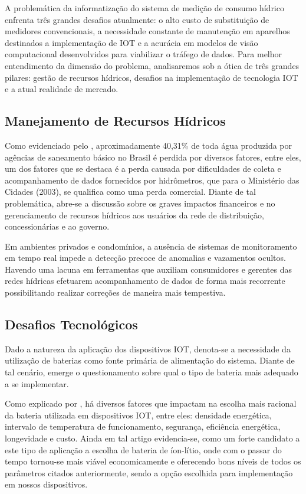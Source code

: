 
A problemática da informatização do sistema de medição de consumo hídrico enfrenta três grandes desafios atualmente: 
o alto custo de substituição de medidores convencionais, a necessidade constante de manutenção em aparelhos destinados a implementação de IOT e a acurácia em modelos de visão computacional desenvolvidos para viabilizar o tráfego de dados. 
Para melhor entendimento da dimensão do problema, analisaremos sob a ótica de três grandes pilares: gestão de recursos hídricos, desafios na implementação de tecnologia IOT e a atual realidade de mercado.

\subsection{Manejamento de Recursos Hídricos}

Como evidenciado pelo , aproximadamente  40,31\% de toda água produzida por agências de saneamento básico no Brasil é perdida por diversos fatores, entre eles, um dos fatores que se destaca é a perda causada por dificuldades de coleta e acompanhamento de dados fornecidos por hidrômetros, que para o Ministério das Cidades (2003), se qualifica como uma perda comercial. 
Diante de tal problemática, abre-se a discussão sobre os graves impactos financeiros e no gerenciamento de recursos hídricos aos usuários da rede de distribuição, concessionárias e ao governo.

Em ambientes privados e condomínios, a ausência de sistemas de monitoramento em tempo real impede a detecção precoce de anomalias e vazamentos ocultos. 
Havendo uma lacuna em ferramentas que auxiliam consumidores e gerentes das redes hídricas efetuarem acompanhamento de dados de forma mais recorrente possibilitando realizar correções de maneira mais tempestiva.

\subsection{Desafios Tecnológicos}

Dado a natureza da aplicação dos dispositivos IOT, denota-se a necessidade da utilização de baterias como fonte primária de alimentação do sistema. 
Diante de tal cenário, emerge o questionamento sobre qual o tipo de bateria mais adequado a se implementar. 

Como explicado por , há diversos fatores que impactam na escolha mais racional da bateria utilizada em dispositivos IOT, entre eles: densidade energética, intervalo de temperatura de funcionamento, segurança, eficiência energética, longevidade e custo.
Ainda em tal artigo evidencia-se, como um forte candidato a este tipo de aplicação a escolha de bateria de íon-lítio, onde com o passar do tempo tornou-se mais viável economicamente e oferecendo bons níveis de todos os parâmetros citados anteriormente, sendo a opção escolhida para implementação em nossos dispositivos.

